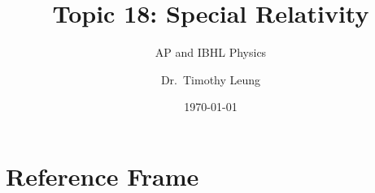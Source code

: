 \documentclass[12pt,compress,aspectratio=169]{beamer}
\title{Topic 18: Special Relativity}
\subtitle{AP and IBHL Physics}
\author[TML]{Dr.\ Timothy Leung}
\institute{Olympiads School}
\date{\today}
\begin{document}
\begin{frame}
  \maketitle
\end{frame}

%
%
%


\section{Reference Frame}
\end{document}
